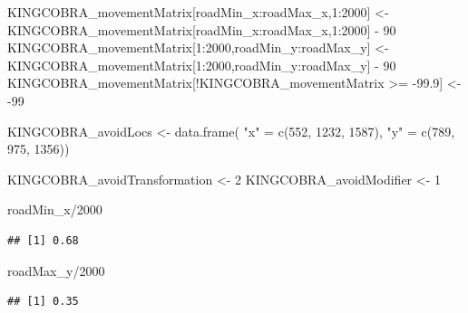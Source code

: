 \documentclass[10pt,a4paper]{article}
\newenvironment{Shaded}{}{}
\newcommand{\DecValTok}[1]{#1}
\newcommand{\FloatTok}[1]{#1}
\newcommand{\FunctionTok}[1]{#1}
\newcommand{\NormalTok}[1]{#1}
\newcommand{\OtherTok}[1]{#1}
\newcommand{\SpecialCharTok}[1]{#1}
\newcommand{\StringTok}[1]{#1}
\begin{document}
\begin{Shaded}
\begin{Highlighting}[]
\NormalTok{KINGCOBRA\_movementMatrix[roadMin\_x}\SpecialCharTok{:}\NormalTok{roadMax\_x,}\DecValTok{1}\SpecialCharTok{:}\DecValTok{2000}\NormalTok{] }\OtherTok{\textless{}{-}}
\NormalTok{  KINGCOBRA\_movementMatrix[roadMin\_x}\SpecialCharTok{:}\NormalTok{roadMax\_x,}\DecValTok{1}\SpecialCharTok{:}\DecValTok{2000}\NormalTok{] }\SpecialCharTok{{-}} \DecValTok{90}
\NormalTok{KINGCOBRA\_movementMatrix[}\DecValTok{1}\SpecialCharTok{:}\DecValTok{2000}\NormalTok{,roadMin\_y}\SpecialCharTok{:}\NormalTok{roadMax\_y] }\OtherTok{\textless{}{-}}
\NormalTok{  KINGCOBRA\_movementMatrix[}\DecValTok{1}\SpecialCharTok{:}\DecValTok{2000}\NormalTok{,roadMin\_y}\SpecialCharTok{:}\NormalTok{roadMax\_y] }\SpecialCharTok{{-}} \DecValTok{90}
\NormalTok{KINGCOBRA\_movementMatrix[}\SpecialCharTok{!}\NormalTok{KINGCOBRA\_movementMatrix }\SpecialCharTok{\textgreater{}=} \SpecialCharTok{{-}}\FloatTok{99.9}\NormalTok{] }\OtherTok{\textless{}{-}} \SpecialCharTok{{-}}\DecValTok{99}

\NormalTok{KINGCOBRA\_avoidLocs }\OtherTok{\textless{}{-}} \FunctionTok{data.frame}\NormalTok{(}
  \StringTok{"x"} \OtherTok{=} \FunctionTok{c}\NormalTok{(}\DecValTok{552}\NormalTok{, }\DecValTok{1232}\NormalTok{, }\DecValTok{1587}\NormalTok{),}
  \StringTok{"y"} \OtherTok{=} \FunctionTok{c}\NormalTok{(}\DecValTok{789}\NormalTok{, }\DecValTok{975}\NormalTok{, }\DecValTok{1356}\NormalTok{))}

\NormalTok{KINGCOBRA\_avoidTransformation }\OtherTok{\textless{}{-}} \DecValTok{2}
\NormalTok{KINGCOBRA\_avoidModifier }\OtherTok{\textless{}{-}} \DecValTok{1}

\NormalTok{roadMin\_x}\SpecialCharTok{/}\DecValTok{2000}
\end{Highlighting}
\end{Shaded}

\begin{verbatim}
## [1] 0.68
\end{verbatim}

\begin{Shaded}
\begin{Highlighting}[]
\NormalTok{roadMax\_y}\SpecialCharTok{/}\DecValTok{2000}
\end{Highlighting}
\end{Shaded}

\begin{verbatim}
## [1] 0.35
\end{verbatim}
\end{document}
